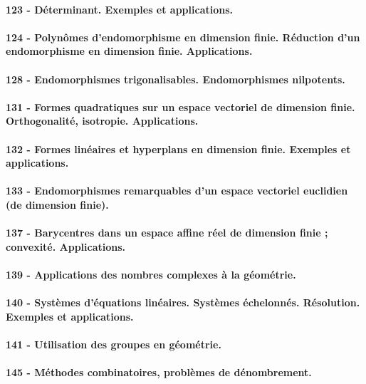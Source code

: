 \paragraph{123 - Déterminant. Exemples et applications.}
\paragraph{124 - Polynômes d’endomorphisme en dimension finie. Réduction d’un endomorphisme en dimension finie. Applications.}
\paragraph{128 - Endomorphismes trigonalisables. Endomorphismes nilpotents.}
\paragraph{131 - Formes quadratiques sur un espace vectoriel de dimension finie. Orthogonalité, isotropie. Applications.}
\paragraph{132 - Formes linéaires et hyperplans en dimension finie. Exemples et applications.}
\paragraph{133 - Endomorphismes remarquables d’un espace vectoriel euclidien (de dimension finie).}
\paragraph{137 - Barycentres dans un espace affine réel de dimension finie ; convexité. Applications.}
\paragraph{139 - Applications des nombres complexes à la géométrie.}
\paragraph{140 - Systèmes d’équations linéaires. Systèmes échelonnés. Résolution. Exemples et applications.}
\paragraph{141 - Utilisation des groupes en géométrie.}
\paragraph{145 - Méthodes combinatoires, problèmes de dénombrement.}
